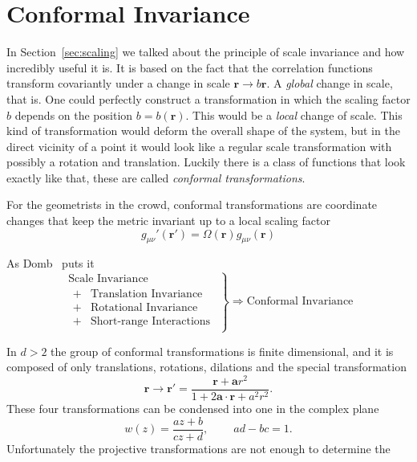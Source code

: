 \section{Conformal Invariance}
\label{ch:conf}

In Section~\ref{sec:scaling} we talked about the principle of scale invariance
and how incredibly useful it is. It is based on the fact that the correlation
functions transform covariantly under a change in scale $\mathbf{r}\rightarrow
b\mathbf{r}$. A \textit{global} change in scale, that is. One could perfectly
construct a transformation in which the scaling factor $b$ depends on the
position $b=b(\mathbf{r})$. This would be a \textit{local} change of scale.
This kind of transformation would deform the overall shape of the system, but
in the direct vicinity of a point it would look like a regular scale
transformation with possibly a rotation and translation. Luckily there is a
class of functions that look exactly like that, these are called
\textit{conformal transformations}.

For the geometrists in the crowd, conformal transformations are coordinate
changes that keep the metric invariant up to a local scaling factor
\begin{equation}
    g_{\mu\nu}'\left(\mathbf{r}'\right)=
    \Omega\left(\mathbf{r}\right)g_{\mu\nu}\left(\mathbf{r}\right)
\end{equation}


As Domb~\cite{Domb1972} puts it
\begin{equation*}
    \left.\begin{array}{l}
            \mbox{Scale Invariance}\\
            \begin{array}{cl}
                + & \mbox{Translation Invariance}\\
                + & \mbox{Rotational Invariance}\\
                + & \mbox{Short-range Interactions}
            \end{array}
        \end{array}
    \right\} \Rightarrow\mbox{Conformal Invariance}
\end{equation*}

In $d>2$ the group of conformal transformations is finite dimensional, and
it is composed of only translations, rotations, dilations and the special
transformation
\begin{equation}
    \mathbf{r}\rightarrow\mathbf{r}'=
    \frac{\mathbf{r}+\mathbf{a}r^{2}}{1+2\mathbf{a}\cdot\mathbf{r}+a^{2}r^{2}}.
\end{equation}
These four transformations can be condensed into one in the complex plane
\begin{equation}
    w\left(z\right)=\frac{az+b}{cz+d},\;\;\;\;\;\;\;\; ad-bc=1.
\end{equation}
Unfortunately the projective transformations are not enough to determine the 


